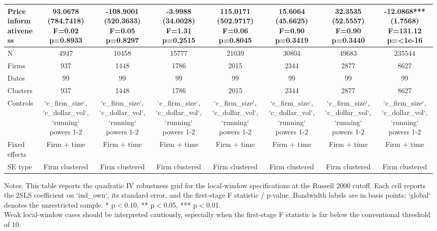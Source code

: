 \begin{table}[!htbp]
\begin{threeparttable}
\begin{tabular}{lccccccc}
Price informativeness & \shortstack{93.0678\\(784.7418)\\F=0.02\\p=0.8933} & \shortstack{-108.9001\\(520.3633)\\F=0.05\\p=0.8297} & \shortstack{-3.9988\\(34.0028)\\F=1.31\\p=0.2515} & \shortstack{115.0171\\(502.9717)\\F=0.06\\p=0.8045} & \shortstack{15.6064\\(45.6625)\\F=0.90\\p=0.3419} & \shortstack{32.3535\\(52.5557)\\F=0.90\\p=0.3440} & \shortstack{-12.0868***\\(1.7568)\\F=131.12\\p=<1e-16} \\
\midrule
N & 4947 & 10458 & 15777 & 21039 & 30804 & 49683 & 235544 \\
Firms & 937 & 1448 & 1786 & 2015 & 2344 & 2877 & 8627 \\
Dates & 99 & 99 & 99 & 99 & 99 & 99 & 99 \\
Clusters & 937 & 1448 & 1786 & 2015 & 2344 & 2877 & 8627 \\
Controls & `c_firm_size`, `c_dollar_vol`, `running` powers 1-2 & `c_firm_size`, `c_dollar_vol`, `running` powers 1-2 & `c_firm_size`, `c_dollar_vol`, `running` powers 1-2 & `c_firm_size`, `c_dollar_vol`, `running` powers 1-2 & `c_firm_size`, `c_dollar_vol`, `running` powers 1-2 & `c_firm_size`, `c_dollar_vol`, `running` powers 1-2 & `c_firm_size`, `c_dollar_vol`, `running` powers 1-2 \\
Fixed effects & Firm + time & Firm + time & Firm + time & Firm + time & Firm + time & Firm + time & Firm + time \\
SE type & Firm clustered & Firm clustered & Firm clustered & Firm clustered & Firm clustered & Firm clustered & Firm clustered \\
\bottomrule
\end{tabular}
\vspace{0.35em}
\noindent\parbox{\textwidth}{\footnotesize
Notes: This table reports the quadratic IV robustness grid for the local-window specifications at the Russell 2000 cutoff. Each cell reports the 2SLS coefficient on `ind_own`, its standard error, and the first-stage F statistic / p-value. Bandwidth labels are in basis points; `global` denotes the unrestricted sample. * p$<$0.10, ** p$<$0.05, *** p$<$0.01.\\
Weak local-window cases should be interpreted cautiously, especially when the first-stage F statistic is far below the conventional threshold of 10.
}
\end{threeparttable}
\end{table}
